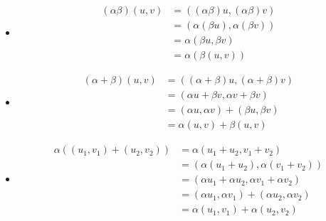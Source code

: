 \documentclass{article}
\begin{document}
\begin{enumerate}
\begin{itemize}
            \item
                \begin{align*}
                    (\alpha \beta) (u, v) &= ((\alpha \beta) u, (\alpha \beta)
                    v) \\
                        &= (\alpha (\beta u), \alpha (\beta v)) \\
                        &= \alpha (\beta u, \beta v) \\
                        &= \alpha (\beta (u, v))
                \end{align*}

            \item
                \begin{align*}
                    (\alpha + \beta) (u, v) &= ((\alpha + \beta) u, (\alpha +
                    \beta) v) \\
                        &= (\alpha u + \beta v, \alpha v + \beta v) \\
                        &= (\alpha u, \alpha v) + (\beta u, \beta v) \\
                        &= \alpha (u, v) + \beta (u, v)
                \end{align*}

            \item
                \begin{align*}
                    \alpha ( (u_1, v_1) + (u_2, v_2) ) &= \alpha (u_1 + u_2, v_1
                    + v_2) \\
                    &= (\alpha (u_1 + u_2), \alpha (v_1 + v_2)) \\
                    &= (\alpha u_1 + \alpha u_2, \alpha v_1 + \alpha v_2) \\
                    &= (\alpha u_1, \alpha v_1) + (\alpha u_2, \alpha v_2) \\
                    &= \alpha (u_1, v_1) + \alpha (u_2, v_2)
                \end{align*}
        \end{itemize}
\end{enumerate}
\end{document}
